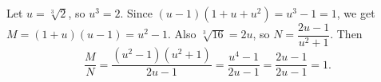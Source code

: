 Let $u=\sqrt[3]2$, so $u^3=2$. Since $(u-1)(1+u+u^2)=u^3-1=1$, we get $M=(1+u)(u-1)=u^2-1$. Also $\sqrt[3]{16}=2u$, so $N=\dfrac{2u-1}{u^2+1}$. Then
\[\dfrac MN=\dfrac{(u^2-1)(u^2+1)}{2u-1}=\dfrac{u^4-1}{2u-1}=\dfrac{2u-1}{2u-1}=\boxed{1}.\]
